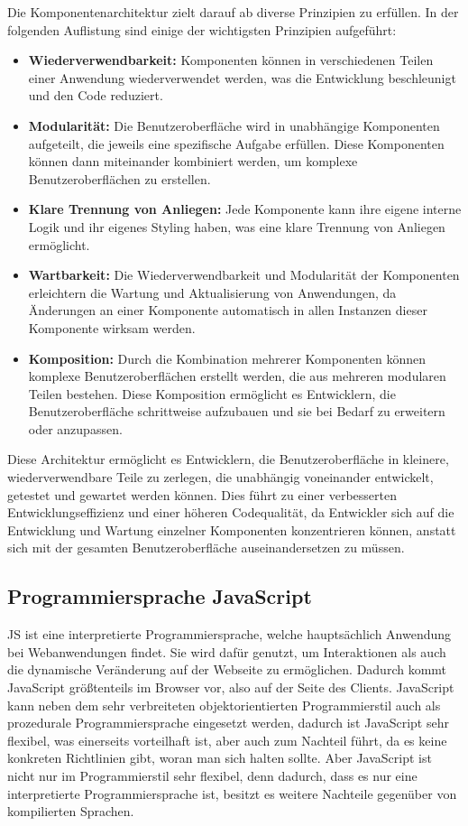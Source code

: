 Die Komponentenarchitektur zielt darauf ab diverse Prinzipien zu erfüllen. In der folgenden Auflistung sind einige der wichtigsten Prinzipien aufgeführt:

\begin{itemize}
    \item \textbf{Wiederverwendbarkeit:} Komponenten können in verschiedenen Teilen einer Anwendung wiederverwendet werden, was die Entwicklung beschleunigt und den Code reduziert.
    \item \textbf{Modularität:} Die Benutzeroberfläche wird in unabhängige Komponenten aufgeteilt, die jeweils eine spezifische Aufgabe erfüllen. Diese Komponenten können dann miteinander kombiniert werden, um komplexe Benutzeroberflächen zu erstellen.
    \item \textbf{Klare Trennung von Anliegen:} Jede Komponente kann ihre eigene interne Logik und ihr eigenes Styling haben, was eine klare Trennung von Anliegen ermöglicht.
    \item \textbf{Wartbarkeit:} Die Wiederverwendbarkeit und Modularität der Komponenten erleichtern die Wartung und Aktualisierung von Anwendungen, da Änderungen an einer Komponente automatisch in allen Instanzen dieser Komponente wirksam werden.
    \item \textbf{Komposition:} Durch die Kombination mehrerer Komponenten können komplexe Benutzeroberflächen erstellt werden, die aus mehreren modularen Teilen bestehen. Diese Komposition ermöglicht es Entwicklern, die Benutzeroberfläche schrittweise aufzubauen und sie bei Bedarf zu erweitern oder anzupassen.
\end{itemize}

Diese Architektur ermöglicht es Entwicklern, die Benutzeroberfläche in kleinere, wiederverwendbare Teile zu zerlegen, die unabhängig voneinander entwickelt, getestet und gewartet werden können. Dies führt zu einer verbesserten Entwicklungseffizienz und einer höheren Codequalität, da Entwickler sich auf die Entwicklung und Wartung einzelner Komponenten konzentrieren können, anstatt sich mit der gesamten Benutzeroberfläche auseinandersetzen zu müssen.\cite{component-architecture:1, component-architecture:2}

\subsection{Programmiersprache JavaScript}
\label{chapter:3-javaScript}

\acl{JS} ist eine interpretierte Programmiersprache, welche hauptsächlich Anwendung bei Webanwendungen findet. Sie wird dafür genutzt, um Interaktionen als auch die dynamische Veränderung auf der Webseite zu ermöglichen. Dadurch kommt JavaScript größtenteils im Browser vor, also auf der Seite des Clients. JavaScript kann neben dem sehr verbreiteten objektorientierten Programmierstil auch als prozedurale Programmiersprache eingesetzt werden, dadurch ist JavaScript sehr flexibel, was einerseits vorteilhaft ist, aber auch zum Nachteil führt, da es keine konkreten Richtlinien gibt, woran man sich halten sollte. Aber JavaScript ist nicht nur im Programmierstil sehr flexibel, denn dadurch, dass es nur eine interpretierte Programmiersprache ist, besitzt es weitere Nachteile gegenüber von kompilierten Sprachen.

